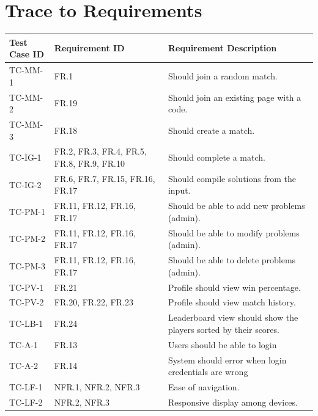 \documentclass[12pt, titlepage]{article}
\begin{document}
\section{Trace to Requirements}
\begin{longtable}{| p{2.5cm} | p{3cm} | p{8cm}| }
    \hline
    Test Case ID & Requirement ID & Requirement Description\\
    \hline
    TC-MM-1 & FR.1 & Should join a random match.\\
    \hline
    TC-MM-2 & FR.19 & Should join an existing page with a code. \\
     \hline
    TC-MM-3 & FR.18 & Should create a match. \\
     \hline
    TC-IG-1 & FR.2, FR.3, FR.4, FR.5, FR.8, FR.9, FR.10 & Should complete a match. \\
     \hline
    TC-IG-2 & FR.6, FR.7, FR.15, FR.16, FR.17 & Should compile solutions from the input.\\
     \hline
    TC-PM-1 & FR.11, FR.12, FR.16, FR.17 & Should be able to add new problems (admin).\\
     \hline
    TC-PM-2 & FR.11, FR.12, FR.16, FR.17 & Should be able to modify problems (admin).\\
     \hline
    TC-PM-3 & FR.11, FR.12, FR.16, FR.17 & Should be able to delete problems (admin).\\
     \hline
    TC-PV-1 & FR.21 & Profile should view win percentage.\\
    \hline
    TC-PV-2 & FR.20, FR.22, FR.23  & Profile should view match history.\\
    \hline
    TC-LB-1 & FR.24 & Leaderboard view should show the players sorted by their scores.\\
    \hline
    TC-A-1 & FR.13 & Users should be able to login\\
    \hline
    TC-A-2 & FR.14 & System should error when login credentials are wrong\\
    \hline
    TC-LF-1 & NFR.1, NFR.2, NFR.3 & Ease of navigation.\\
    \hline
    TC-LF-2 & NFR.2, NFR.3  & Responsive display among devices.\\

\end{longtable}
\end{document}
